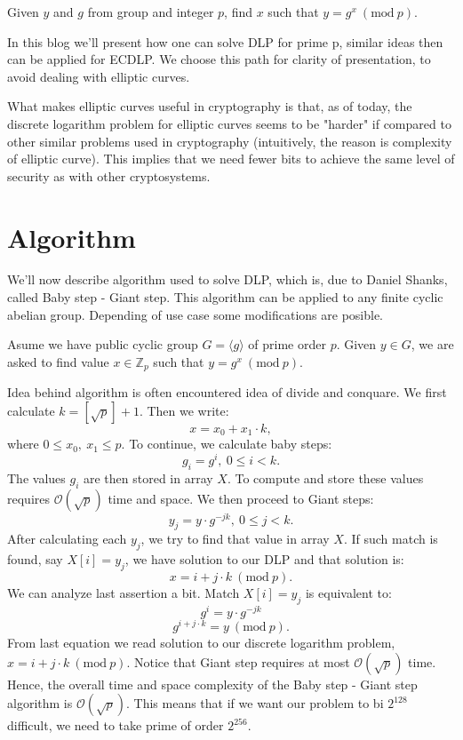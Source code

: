 \documentclass[fleqn,10pt]{olplainarticle}
\begin{document}
Given $y$ and $g$ from group and integer $p$, find $x$ such that 
$y=g^x \ (\textrm {mod}\ p)$.
\vspace{0.2cm}

In this blog we'll present how one can solve DLP for prime p, 
similar ideas then can be applied for ECDLP. We choose this path 
for clarity of presentation, to avoid dealing with elliptic 
curves.

What makes elliptic curves useful in cryptography is that, 
as of today, the discrete logarithm problem for elliptic curves 
seems to be "harder" if compared to other similar problems used 
in cryptography (intuitively, the reason is complexity of 
elliptic curve).  This implies that we need fewer bits to 
achieve the same level of security as with other cryptosystems.

\section*{Algorithm}

We'll now describe algorithm used to solve DLP, which is, due to 
Daniel Shanks, called Baby step - Giant step. This algorithm can 
be applied to any finite cyclic abelian group. Depending of use 
case some modifications are posible.
\vspace{0.2cm}

Asume we have public cyclic group $G=\langle g \rangle$ of prime order $p$. 
Given $y\in G$, we are asked to find value $x\in\mathbb{Z}_p$ 
such that $y=g^x\ (\textrm {mod}\ p)$.
\vspace{0.2cm}

Idea behind algorithm is often encountered idea of divide and 
conquare. We first calculate $k=[\sqrt{p}]+1$. Then we write:
$$x=x_0+x_1\cdot k,$$
where $0\leq x_0,\ x_1\leq p$.
To continue, we calculate baby steps:
$$g_i = g^i,\ 0\leq i < k.$$
The values $g_i$ are then stored in array $X$. To compute and store these values requires $\mathcal{O}(\sqrt{p})$ time and space. We then proceed to Giant steps:
$$y_j = y\cdot g^{-jk},\ 0\leq j< k.$$
After calculating each $y_j$, we try to find that value in array $X$. If such match is found, say $X[i]=y_j$, we have solution to our DLP and that solution is:
$$x=i+j\cdot k\ (\textrm {mod}\ p).$$
We can analyze last assertion a bit. Match  $X[i]=y_j$ is equivalent to:
$$g^i=y\cdot g^{-jk}$$
$$g^{i+j\cdot k}=y \ (\textrm{mod}\ p).$$
From last equation we read solution to our discrete logarithm problem, $x=i+j\cdot k\ (\textrm {mod}\ p).$
Notice that Giant step requires at most $\mathcal{O}(\sqrt{p})$ time. Hence, the overall time and space complexity of the Baby step - Giant step algorithm is $\mathcal{O}(\sqrt{p})$. This means that if we want our problem to bi $2^{128}$ difficult, we need to take prime of order $2^{256}$.
\end{document}
